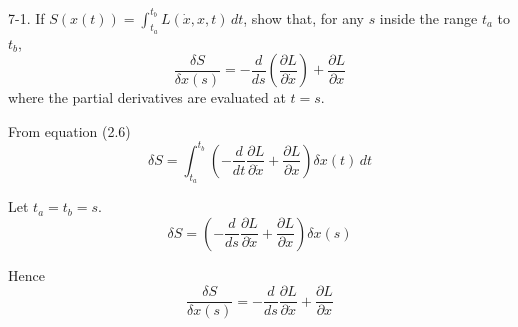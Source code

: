 \documentclass[12pt]{article}
\begin{document}
7-1.
If $S(x(t))=\int_{t_a}^{t_b}L(\dot x,x,t)\,dt$, show that, for any
$s$ inside the range $t_a$ to $t_b$,
\begin{equation*}
\frac{\delta S}{\delta x(s)}=-\frac{d}{ds}\left(\frac{\partial L}{\partial\dot x}\right)
+\frac{\partial L}{\partial x}
\end{equation*}
where the partial derivatives are evaluated at $t=s$.

\bigskip
From equation (2.6)
\begin{equation*}
\delta S=\int_{t_a}^{t_b}\left(-\frac{d}{dt}\frac{\partial L}{\partial\dot x}
+\frac{\partial L}{\partial x}\right)\delta x(t)\,dt
\end{equation*}

Let $t_a=t_b=s$.
\begin{equation*}
\delta S=\left(-\frac{d}{ds}\frac{\partial L}{\partial\dot x}
+\frac{\partial L}{\partial x}\right)\delta x(s)
\end{equation*}

Hence
\begin{equation*}
\frac{\delta S}{\delta x(s)}=
-\frac{d}{ds}\frac{\partial L}{\partial\dot x}
+\frac{\partial L}{\partial x}
\end{equation*}
\end{document}
